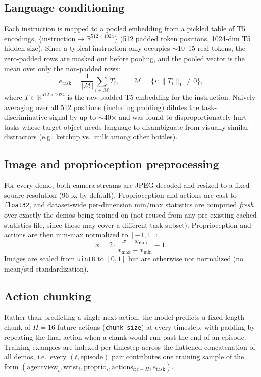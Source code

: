\documentclass[11pt]{article}
\begin{document}
\subsection{Language conditioning}

Each instruction is mapped to a pooled embedding from a pickled table of T5 encodings,
$\{\text{instruction} \rightarrow \mathbb{R}^{512 \times 1024}\}$ (512 padded token positions,
1024-dim T5 hidden size). Since a typical instruction only occupies $\sim$10--15 real tokens, the
zero-padded rows are masked out before pooling, and the pooled vector is the mean over only the
non-padded rows:
\begin{equation}
    e_{\text{task}} = \frac{1}{|\mathcal{M}|} \sum_{i \in \mathcal{M}} T_i, \qquad
    \mathcal{M} = \{ i : \|T_i\|_1 \neq 0 \},
\end{equation}
where $T \in \mathbb{R}^{512 \times 1024}$ is the raw padded T5 embedding for the instruction.
Naively averaging over all 512 positions (including padding) dilutes the task-discriminative
signal by up to $\sim$40$\times$ and was found to disproportionately hurt tasks whose target
object needs language to disambiguate from visually similar distractors (e.g.\ ketchup vs.\ milk
among other bottles).

\subsection{Image and proprioception preprocessing}

For every demo, both camera streams are JPEG-decoded and resized to a fixed square resolution
(96\,px by default). Proprioception and actions are cast to \texttt{float32}, and dataset-wide
per-dimension min/max statistics are computed \emph{fresh} over exactly the demos being trained
on (not reused from any pre-existing cached statistics file, since those may cover a different
task subset). Proprioception and actions are then min-max normalized to $[-1, 1]$:
\begin{equation}
    \tilde{x} = 2 \cdot \frac{x - x_{\min}}{x_{\max} - x_{\min}} - 1.
\end{equation}
Images are scaled from \texttt{uint8} to $[0, 1]$ but are otherwise not normalized (no
mean/std standardization).

\subsection{Action chunking}

Rather than predicting a single next action, the model predicts a fixed-length chunk of $H = 16$
future actions (\texttt{chunk\_size}) at every timestep, with padding by repeating the final
action when a chunk would run past the end of an episode. Training examples are indexed
per-timestep across the flattened concatenation of all demos, i.e.\ every $(t, \text{episode})$
pair contributes one training sample of the form
$(\text{agentview}_t, \text{wrist}_t, \text{proprio}_t, \text{actions}_{t:t+H}, e_{\text{task}})$.
\end{document}
